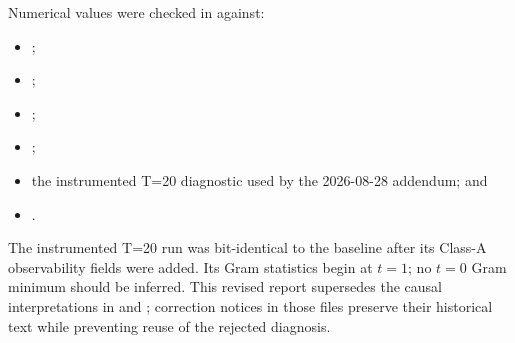 \documentclass[11pt]{article}
\begin{document}
Numerical values were checked in
 against:
\begin{itemize}
\item {};
\item {};
\item {};
\item {};
\item the instrumented T=20 diagnostic used by the 2026-08-28 addendum; and
\item {}.
\end{itemize}

The instrumented T=20 run was bit-identical to the baseline after its Class-A
observability fields were added. Its Gram statistics begin at $t=1$; no $t=0$
Gram minimum should be inferred. This revised report supersedes the causal
interpretations in  and
; correction notices in
those files preserve their historical text while preventing reuse of the
rejected diagnosis.
\end{document}
